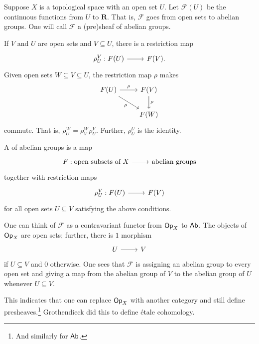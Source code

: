 \documentclass [11 pt, oneside] {article}
\begin{document}
\begin{example}[Motivation]\label{}\text{}
Suppose $X$ is a topological space with an open set $U$. Let $\mathscr{F}(U)$ be the continuous functions from $U$ to $\mathbf{R}$. That is, $\mathscr{F}$ goes from open sets to abelian groups. One will call $\mathscr{F}$ a (pre)sheaf of abelian groups. 

If $V$ and $U$ are open sets and $V\subseteq U$, there is a restriction map
\[
\begin{tikzcd}
\rho_{U}^V : \mathscr{F}(U)  \ar[r]& \mathscr{F}(V).
\end{tikzcd}
\]
Given open sets $W\subseteq V\subseteq U$, the restriction map $\rho$ makes
\[
\begin{tikzcd}
	\mathscr{F}(U)\ar[r,"\rho"] \ar[dr,"\rho", swap] &  \mathscr{F}(V)\ar[d,"\rho"] \\
						   & \mathscr{F}(W)
\end{tikzcd}
\]
commute. That is, $\rho_{U}^W = \rho_{V}^W \rho_{U}^V$. Further, $\rho_{U}^U$ is the identity.

A  of abelian groups is a map
\[
\begin{tikzcd}
\mathscr{F} : \textrm{open subsets of $X$} \ar[r]& \textrm{abelian groups}
\end{tikzcd}
\]
together with restriction maps 
\[
\begin{tikzcd}
\rho_{U}^V : \mathscr{F}(U) \ar[r]&  \mathscr{F}(V)
\end{tikzcd}
\]
for all open sets $U\subseteq V$ satisfying the above conditions. 
\end{example}

One can think of $\mathscr{F}$ as a contravariant functor from $\textsf{Op}_X$ to $\textsf{Ab}$. The objects of $\textsf{Op}_X$ are open sets; further, there is $1$ morphism 
\[
\begin{tikzcd}
U\ar[r]&V
\end{tikzcd}
\]
if $U\subseteq V$ and $0$ otherwise. One sees that $\mathscr{F}$ is assigning an abelian group to every open set and giving a map from the abelian group of $V$ to the abelian group of $U$ whenever $U\subseteq V$.

\begin{remark}
	This indicates that one can replace $\textsf{Op}_X$ with another category and still define presheaves.\footnote{And similarly for $\textsf{Ab}$.} Grothendieck did this to define \'etale cohomology.
\end{remark}
\end{document}

